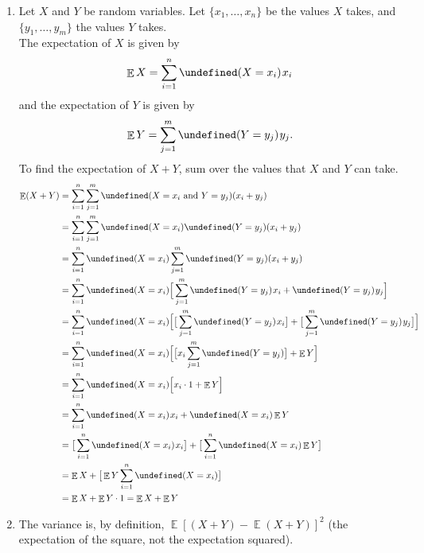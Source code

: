 \documentclass{article}
\let\P\undefined
\DeclareMathOperator\P{\mathbb{P}}
\DeclareMathOperator\E{\mathbb{E}}
\newcommand\halfcomma{\mskip 1.5mu}
\begin{document}
\begin{enumerate}
    \item Let \(X\) and \(Y\) be random variables.
Let \(\{x_{1}, \dotsc, x_{n}\}\) be the values \(X\) takes, and \(\{y_{1}, \dotsc, y_{m}\}\) the values \(Y\) takes.\\

The expectation of \(X\) is given by
\begin{equation*}
\E X = \sum_{i = 1}^{n} \P(X = x_{i}) \halfcomma x_{i}
\end{equation*}
and the expectation of \(Y\) is given by
\begin{equation*}
\E Y = \sum_{j = 1}^{m} \P(Y = y_{j}) \halfcomma y_{j}
.
\end{equation*}
To find the expectation of \(X + Y\), sum over the values that \(X\) and \(Y\) can take.
\begin{align*}
\E (X + Y) &= \sum_{i = 1}^{n} \sum_{j = 1}^{m} \P(X = x_{i}\text{ and }Y = y_{j})(x_{i} + y_{j})\\
&= \sum_{i = 1}^{n} \sum_{j = 1}^{m} \P(X = x_{i}) \P(Y = y_{j}) (x_{i} + y_{j})\\
&= \sum_{i = 1}^{n} \P(X = x_{i}) \sum_{j = 1}^{m} \P(Y = y_{j}) (x_{i} + y_{j})\\
&= \sum_{i = 1}^{n} \P(X = x_{i}) \Big[\sum_{j = 1}^{m} \P(Y = y_{j}) \halfcomma x_{i} + \P(Y = y_{j}) \halfcomma y_{j}\Big]\\
&= \sum_{i = 1}^{n} \P(X = x_{i}) \Big[\big[\sum_{j = 1}^{m} \P(Y = y_{j}) \halfcomma x_{i}\big] + \big[\sum_{j = 1}^{m} \P(Y = y_{j}) \halfcomma y_{j}\big]\Big]\\
&= \sum_{i = 1}^{n} \P(X = x_{i}) \Big[\big[x_{i} \sum_{j = 1}^{m} \P(Y = y_{j})\big] + \E Y\Big]\\
&= \sum_{i = 1}^{n} \P(X = x_{i}) \Big[x_{i} \cdot 1 + \E Y\Big]\\
&= \sum_{i = 1}^{n} \P(X = x_{i}) \halfcomma x_{i} + \P(X = x_{i}) \E Y\\
&= \big[\sum_{i = 1}^{n} \P(X = x_{i}) \halfcomma x_{i}\big] + \big[\sum_{i = 1}^{n} \P(X = x_{i}) \E Y\big]\\
&= \E X + \big[\E Y \sum_{i = 1}^{n} \P(X = x_{i})\big]\\
&= \E X + \E Y \cdot 1
= \E X + \E Y
\end{align*}
\newpage
\item The variance is, by definition, \(\E[(X + Y) - \E(X + Y)]^{2}\) (the expectation of the square, not the expectation squared).
\begin{align*}

\end{align*}
\end{enumerate}
\end{document}
